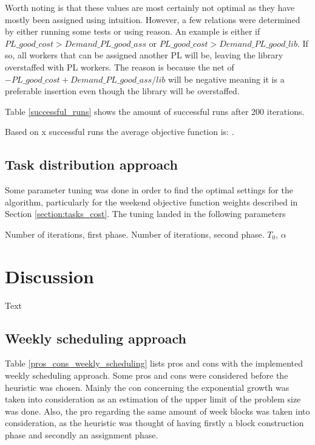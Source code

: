 Worth noting is that these values are most certainly not optimal as they have mostly been assigned using intuition. However, a few relations were determined by either running some tests or using reason. An example is either if $PL\_good\_cost > Demand\_PL\_good\_ass$ or $PL\_good\_cost > Demand\_PL\_good\_lib$. If so, all workers that can be assigned another PL will be, leaving the library overstaffed with PL workers. The reason is because the net of $-PL\_good\_cost + Demand\_PL\_good\_ass/lib$ will be negative meaning it is a preferable insertion even though the library will be overstaffed.

Table \ref{successful_runs} shows the amount of successful runs after 200 iterations.

Based on x successful runs the average objective function is: . 



\subsection{Task distribution approach}

Some parameter tuning was done in order to find the optimal settings for the algorithm, particularly for the weekend objective function weights described in Section \ref{section:tasks_cost}. The tuning landed in the following parameters
 
Number of iterations, first phase.
Number of iterations, second phase.
$T_0$, $\alpha$


\section{Discussion}
Text


\subsection{Weekly scheduling approach}
Table \ref{pros_cons_weekly_scheduling} lists pros and cons with the implemented weekly scheduling approach. Some pros and cons were considered before the heuristic was chosen. Mainly the con concerning the exponential growth was taken into consideration as an estimation of the upper limit of the problem size was done. Also, the pro regarding the same amount of week blocks was taken into consideration, as the heuristic was thought of having firstly a block construction phase and secondly an assignment phase. 

